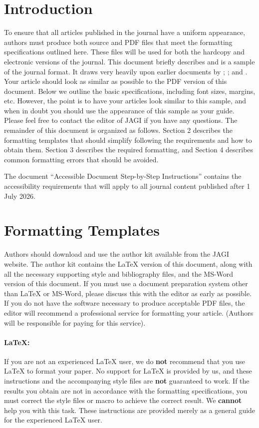 \documentclass[twoside,11pt]{article}
\begin{document}
\section{Introduction}
To ensure that all articles published in the journal have a uniform appearance, authors must produce both source and PDF files that meet the formatting specifications outlined here. These files will be used for both the hardcopy and electronic versions of the journal.  This document briefly describes and is a sample of the journal format. It draws very heavily upon earlier documents by \citet{minton:99}; \citet{kaelbling:00}; and \citet{aaai:07}. Your article should look as similar as possible to the PDF version of this document. Below we outline the basic specifications, including font sizes, margins, etc. However, the point is to have your articles look similar to this sample, and when in doubt you should use the appearance of this sample as your guide. Please feel free to contact the editor of JAGI if you have any questions. The remainder of this document is organized as follows. Section 2 describes the formatting templates that should simplify following the requirements and how to obtain them. Section 3 describes the required formatting, and Section 4 describes common formatting errors that should be avoided. 

The document ``Accessible Document Step-by-Step Instructions'' contains the accessibility requirements that will apply to all journal content published after 1 July 2026.  

\section{Formatting Templates}
Authors should download and use the author kit available from the JAGI website.  The author kit contains the \LaTeX{} version of this document, along with all the necessary supporting style and bibliography files, and the MS-Word version of this document.  If you must use a document preparation system other than \LaTeX{} or MS-Word, please discuss this with the editor as early as possible.  If you do not have the software necessary to produce acceptable PDF files, the editor will recommend a professional service for formatting your article.  (Authors will be responsible for paying for this service).

\paragraph{\LaTeX{}:} If you are not an experienced \LaTeX{} user, we do {\bf not}  recommend that you use \LaTeX{} to format your paper. No support for \LaTeX{} is provided by us, and these instructions and the accompanying style files are {\bf not} guaranteed to work. If the results you obtain are not in accordance with the formatting specifications, you must correct the style files or macro to achieve the correct result. We {\bf cannot} help you with this task. These instructions are provided merely as a general guide for the experienced \LaTeX{} user.
\end{document}
